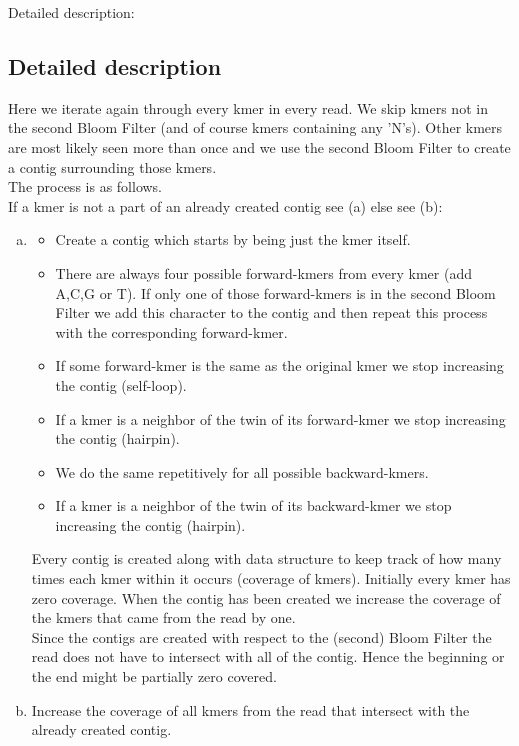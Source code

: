 \documentclass[a4paper]{report}
\begin{document}
Detailed description:
\subsection{Detailed description}
Here we iterate again through every kmer in every read. We skip kmers not in the second Bloom Filter (and of course kmers 
containing any 'N's). 
Other kmers are most likely seen more than once and we use the second Bloom Filter to create a contig surrounding those kmers.\\[4pt]

The process is as follows.\\ 
If a kmer is not a part of an already created contig see (a) else see (b):
\begin{enumerate}[(a)]
\item
\begin{itemize} 
\item Create a contig which starts by being just the kmer itself.
\item There are always four possible forward-kmers from every kmer (add A,C,G or T). If only one of those 
forward-kmers is in the second Bloom Filter we add this character to the contig and then repeat this process
with the corresponding forward-kmer.
\item If some forward-kmer is the same as the original kmer we stop increasing the contig (self-loop).
\item If a kmer is a neighbor of the twin of its forward-kmer we stop increasing the contig (hairpin).
\item We do the same repetitively for all possible backward-kmers.
\item If a kmer is a neighbor of the twin of its backward-kmer we stop increasing the contig (hairpin).
\end{itemize}

Every contig is created along with data structure to keep track of how many times each kmer within it occurs (coverage of kmers).
Initially every kmer has zero coverage. 
When the contig has been created we increase the coverage of the kmers that came from the read by one.\\[4pt]

Since the contigs are created with respect to the (second) Bloom Filter the read does not have to intersect with all of the contig. Hence
the beginning or the end might be partially zero covered.\\[4pt]
\item Increase the coverage of all kmers from the read that intersect with the already created contig.
\end{enumerate}
\end{document}
